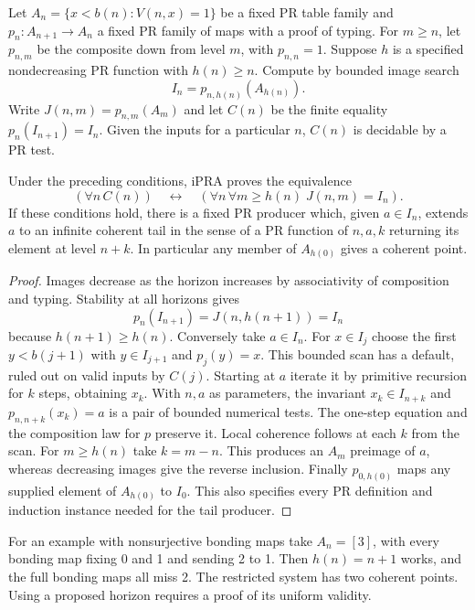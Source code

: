 Let $A_n=\{x<b(n):V(n,x)=1\}$ be a fixed PR table family and $p_n:A_{n+1}\to A_n$ a fixed PR family of maps with a proof of typing. For $m\ge n$, let $p_{n,m}$ be the composite down from level $m$, with $p_{n,n}=1$. Suppose $h$ is a specified nondecreasing PR function with $h(n)\ge n$. Compute by bounded image search
\[
       I_n=p_{n,h(n)}(A_{h(n)}).
\]
Write $J(n,m)=p_{n,m}(A_m)$ and let $C(n)$ be the finite equality $p_n(I_{n+1})=I_n$. Given the inputs for a particular $n$, $C(n)$ is decidable by a PR test.

\begin{theorem}\label{thm:stable}
Under the preceding conditions, iPRA proves the equivalence
\[
 (\forall n\, C(n))\quad\longleftrightarrow\quad
 (\forall n\,\forall m\ge h(n)\; J(n,m)=I_n).
\]
If these conditions hold, there is a fixed PR producer which, given $a\in I_n$, extends $a$ to an infinite coherent tail in the sense of a PR function of $n,a,k$ returning its element at level $n+k$. In particular any member of $A_{h(0)}$ gives a coherent point.
\end{theorem}

\begin{proof}
Images decrease as the horizon increases by associativity of composition and typing. Stability at all horizons gives
\[
 p_n(I_{n+1})=J(n,h(n+1))=I_n
\]
because $h(n+1)\ge h(n)$. Conversely take $a\in I_n$. For $x\in I_j$ choose the first $y<b(j+1)$ with $y\in I_{j+1}$ and $p_j(y)=x$. This bounded scan has a default, ruled out on valid inputs by $C(j)$. Starting at $a$ iterate it by primitive recursion for $k$ steps, obtaining $x_k$. With $n,a$ as parameters, the invariant $x_k\in I_{n+k}$ and $p_{n,n+k}(x_k)=a$ is a pair of bounded numerical tests. The one-step equation and the composition law for $p$ preserve it. Local coherence follows at each $k$ from the scan. For $m\ge h(n)$ take $k=m-n$. This produces an $A_m$ preimage of $a$, whereas decreasing images give the reverse inclusion. Finally $p_{0,h(0)}$ maps any supplied element of $A_{h(0)}$ to $I_0$. This also specifies every PR definition and induction instance needed for the tail producer.
\end{proof}

For an example with nonsurjective bonding maps take $A_n=[3]$, with every bonding map fixing 0 and 1 and sending 2 to 1. Then $h(n)=n+1$ works, and the full bonding maps all miss 2. The restricted system has two coherent points. Using a proposed horizon requires a proof of its uniform validity.

